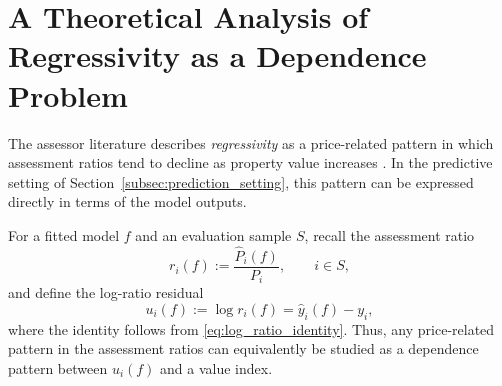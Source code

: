 \documentclass[12pt, draft]{article}
\theoremstyle{plain}
\theoremstyle{definition}
\newcommand{\1}{\mathbf{1}}
\begin{document}
{%


\printbibliography %

\newpage

\appendix



\section{A Theoretical Analysis of Regressivity as a Dependence Problem}
\label{anex:regressivity_dependence}

The assessor literature describes \emph{regressivity} as a price-related pattern in which assessment ratios tend to decline as property value increases \cite{IAAO2013Ratio,IAAO2025ExposureRatio}. In the predictive setting of Section~\ref{subsec:prediction_setting}, this pattern can be expressed directly in terms of the model outputs.

For a fitted model $f$ and an evaluation sample $S$, recall the assessment ratio
\[
r_i(f):=\frac{\widehat P_i(f)}{P_i},
\qquad i\in S,
\]
and define the log-ratio residual
\[
u_i(f):=\log r_i(f)=\hat y_i(f)-y_i,
\]
where the identity follows from \eqref{eq:log_ratio_identity}. Thus, any price-related pattern in the assessment ratios can equivalently be studied as a dependence pattern between $u_i(f)$ and a value index.

}
\end{document}
